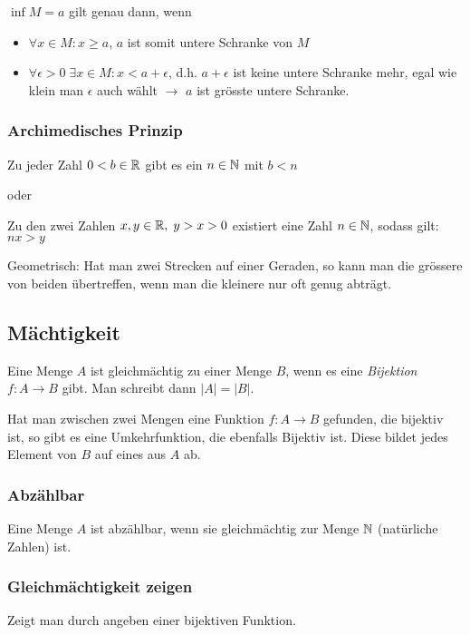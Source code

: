 $\inf M = a$ gilt genau dann, wenn
\begin{itemize}
	\item $\forall x \in M: x \geq a$, $a$ ist somit untere Schranke von $M$
	\item $\forall \epsilon > 0 \; \exists x \in M: x < a + \epsilon$, d.h. $a + \epsilon$ ist keine untere Schranke mehr, egal wie klein man $\epsilon$ auch wählt $\rightarrow$ $a$ ist grösste untere Schranke.
\end{itemize}

\subsubsection{Archimedisches Prinzip}
\begin{satz}
Zu jeder Zahl $0 < b \in \mathbb{R}$ gibt es ein $n \in \mathbb{N}$ mit $b < n$
\end{satz}

oder

\begin{satz}
Zu den zwei Zahlen $x, y \in \mathbb{R}, \; y > x > 0$ existiert eine Zahl $n \in \mathbb{N}$, sodass gilt: $nx > y$
\end{satz}

Geometrisch: Hat man zwei Strecken auf einer Geraden, so kann man die grössere von beiden übertreffen, wenn man die kleinere nur oft genug abträgt.

\subsection{Mächtigkeit}
Eine Menge $A$ ist gleichmächtig zu einer Menge $B$, wenn es eine \textit{Bijektion}
$f: A \rightarrow B$ gibt. Man schreibt dann $|A| = |B|$.

Hat man zwischen zwei Mengen eine Funktion $f: A \rightarrow B$ gefunden, die bijektiv ist,
so gibt es eine Umkehrfunktion, die ebenfalls Bijektiv ist. Diese bildet jedes Element von $B$
auf eines aus $A$ ab.

\subsubsection{Abzählbar}
Eine Menge $A$ ist abzählbar, wenn sie gleichmächtig zur Menge $\mathbb{N}$ (natürliche Zahlen) ist.

\subsubsection{Gleichmächtigkeit zeigen}
Zeigt man durch angeben einer bijektiven Funktion.

